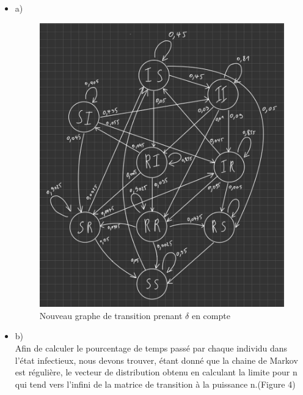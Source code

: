 \documentclass[a4paper, 11pt, oneside]{article}
\begin{document}
\begin{itemize}
    \item a)
    \\    \begin{figure}[h]
        \centering
        \includegraphics[scale=0.55]{graphe2Q5.jpg}
        \caption{Nouveau graphe de transition prenant $\delta$ en compte}
    \end{figure}
    \item b)
    \\Afin de calculer le pourcentage de temps passé par chaque individu 
    dans l'état infectieux, nous devons trouver, étant donné que la chaine de Markov 
    est régulière, le vecteur de distribution obtenu en calculant la limite pour n qui 
    tend vers l'infini de la matrice de transition à la puissance n.(Figure 4)
    \begin{figure}[h]
        \centering

\end{figure}
\end{itemize}
\end{document}
